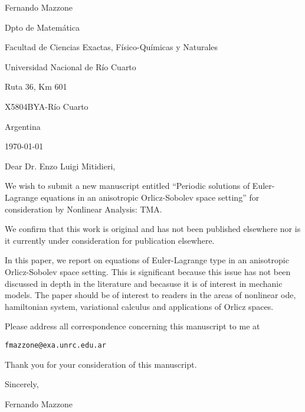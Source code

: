 \documentclass{article}
\begin{document}
\begin{flushright}
Fernando Mazzone

Dpto de Matem\'atica

Facultad de Ciencias Exactas, F\'isico-Qu\'imicas y Naturales

Universidad Nacional de R\'io Cuarto

Ruta 36, Km 601

X5804BYA-R\'io Cuarto

Argentina
\end{flushright}

\today
\vspace{1cm}

Dear Dr. Enzo Luigi Mitidieri, 
\vspace{.5cm}

We wish to submit a new manuscript entitled ``Periodic solutions of
Euler-Lagrange equations in an anisotropic Orlicz-Sobolev space setting'' for consideration by  Nonlinear Analysis: TMA.

We confirm that this work is original and has not been published elsewhere nor is it currently under consideration for publication elsewhere.

In this paper, we report on equations of Euler-Lagrange type in an anisotropic Orlicz-Sobolev space setting. This is significant because this issue has not been discussed in depth in the literature and becasuse it is of interest in mechanic models.  The paper should be of interest to readers in the areas of nonlinear ode, hamiltonian system, variational calculus and applications of Orlicz spaces.

Please address all correspondence concerning this manuscript to me at 

\texttt{fmazzone@exa.unrc.edu.ar}

Thank you for your consideration of this manuscript. 

Sincerely,
\vspace{.5cm}

Fernando Mazzone
\end{document}
